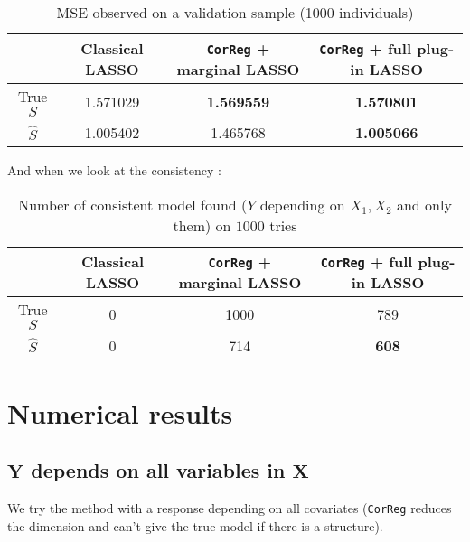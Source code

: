 \documentclass[12pt,a4paper]{report}
\begin{document}
		
		\begin{table}[h!]
		\centering
		\begin{tabular}{|c|c|c|c|}
		\hline 
		 & Classical LASSO & {\tt CorReg} + marginal LASSO& {\tt CorReg} + full plug-in LASSO \\ 
		\hline 
		True $S$ &  1.571029 & \textbf{1.569559} & \textbf{1.570801} \\ 
		\hline 
		$\hat{S}$ & 1.005402 & 1.465768 & \textbf{1.005066} \\ 
		\hline 
		\end{tabular} 
		\caption{MSE observed on a validation sample (1000 individuals)}
		\end{table}

		And when we look at the consistency :
		\begin{table}[h!]
		\centering	
		\begin{tabular}{|c|c|c|c|}
		\hline 
		 & Classical LASSO & {\tt CorReg} + marginal LASSO& {\tt CorReg} + full plug-in LASSO \\ 
		\hline 
		True $S$ &  0 & 1000 & 789 \\ 
		\hline 
		$\hat{S}$ & 0 & 714 & \textbf{608} \\ 
		\hline 
		\end{tabular} 
		\caption{Number of consistent model found ($Y$ depending on $X_1,X_2$ and only them) on $1000$ tries}\label{testidentifiableGM}
		\end{table}				
				
		
		

	\section{Numerical results}
	
	\subsection{$\boldsymbol{Y}$ depends on all variables in $\boldsymbol{X}$}	 	
We try the method with a response depending on all covariates ({\tt CorReg} reduces the dimension and can't give the true model if there is a structure). %
 
 
\FloatBarrier

\newpage
\end{document}
